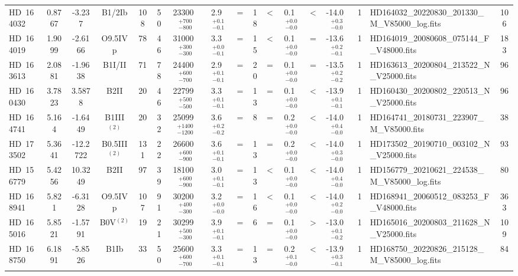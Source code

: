 {\begin{landscape}
\begin{longtable}{lcccccccrcrcrcclc}
\noalign{\smallskip}
\noalign{\smallskip}
HD~164032 & 0.8767 & -3.237 & B1/2Ib & 108 & 50 & 23300~$_{-800}^{+700}$ & 2.9~$_{-0.1}^{+0.1}$ & = & 18 & < & 0.1~$_{-0.0}^{+0.0}$ & < & -14.0~$_{-0.0}^{+0.3}$ & 1 & HD164032\_20220830\_201330\_M\_V85000\_log.fits & 106 \\\noalign{\smallskip}
HD~164019 & 1.9099 & -2.6166 & O9.5IVp & 78 & 46 & 31000~$_{-300}^{+300}$ & 3.3~$_{-0.1}^{+0.0}$ & = & 15 & < & 0.1~$_{-0.0}^{+0.0}$ & = & -13.6~$_{-0.1}^{+0.2}$ & 1 & HD164019\_20080608\_075144\_F\_V48000.fits & 183 \\\noalign{\smallskip}
HD~163613 & 2.0881 & -1.9638 & B1I/II & 71 & 78 & 24400~$_{-700}^{+600}$ & 2.9~$_{-0.1}^{+0.1}$ & = & 20 & = & 0.1~$_{-0.0}^{+0.0}$ & = & -13.5~$_{-0.2}^{+0.2}$ & 1 & HD163613\_20200804\_213522\_N\_V25000.fits & 96 \\\noalign{\smallskip}
HD~160430 & 3.7823 & 3.5878 & B2II & 20 & 46 & 22799~$_{-500}^{+500}$ & 3.3~$_{-0.1}^{+0.1}$ & = & 13 & = & 0.1~$_{-0.0}^{+0.0}$ & < & -13.9~$_{-0.1}^{+0.1}$ & 1 & HD160430\_20200802\_220513\_N\_V25000.fits & 96 \\\noalign{\smallskip}
HD~164741 & 5.164 & -1.6449 & B1III$^{(2)}$ & 20 & 32 & 25099~$_{-1200}^{+1400}$ & 3.6~$_{-0.2}^{+0.2}$ & = & 8 & = & 0.2~$_{-0.0}^{+0.0}$ & < & -14.0~$_{-0.0}^{+0.4}$ & 1 & HD164741\_20180731\_223907\_M\_V85000.fits & 38 \\\noalign{\smallskip}
HD~173502 & 5.3641 & -12.2722 & B0.5III$^{(2)}$ & 131 & 22 & 26600~$_{-900}^{+600}$ & 3.6~$_{-0.1}^{+0.1}$ & = & 13 & = & 0.2~$_{-0.0}^{+0.0}$ & < & -14.0~$_{-0.0}^{+0.3}$ & 1 & HD173502\_20190710\_003102\_N\_V25000.fits & 93 \\\noalign{\smallskip}
HD~156779 & 5.4256 & 10.3249 & B2II & 97 & 39 & 18100~$_{-900}^{+600}$ & 3.0~$_{-0.1}^{+0.1}$ & = & 13 & < & 0.1~$_{-0.0}^{+0.0}$ & < & -14.0~$_{-0.0}^{+0.4}$ & 1 & HD156779\_20210621\_224538\_M\_V85000\_log.fits & 80 \\\noalign{\smallskip}
HD~168941 & 5.821 & -6.3128 & O9.5IVp & 107 & 91 & 30200~$_{-300}^{+400}$ & 3.2~$_{-0.0}^{+0.0}$ & = & 16 & < & 0.1~$_{-0.0}^{+0.0}$ & < & -14.0~$_{-0.0}^{+0.2}$ & 1 & HD168941\_20060512\_083253\_F\_V48000.fits & 363 \\\noalign{\smallskip}
HD~165016 & 5.8521 & -1.5791 & B0V$^{(2)}$ & 19 & 21 & 30299~$_{-300}^{+500}$ & 3.9~$_{-0.1}^{+0.1}$ & = & 6 & = & 0.1~$_{-0.0}^{+0.0}$ & > & -13.0~$_{-0.2}^{+0.1}$ & 1 & HD165016\_20200803\_211628\_N\_V25000.fits & 109 \\\noalign{\smallskip}
HD~168750 & 6.1891 & -5.8526 & B1Ib & 33 & 50 & 25600~$_{-700}^{+600}$ & 3.3~$_{-0.1}^{+0.1}$ & = & 13 & = & 0.2~$_{-0.0}^{+0.1}$ & < & -13.9~$_{-0.1}^{+0.3}$ & 1 & HD168750\_20220826\_215128\_M\_V85000\_log.fits & 84 \\\noalign{\smallskip}

\end{longtable}
\end{landscape}}
